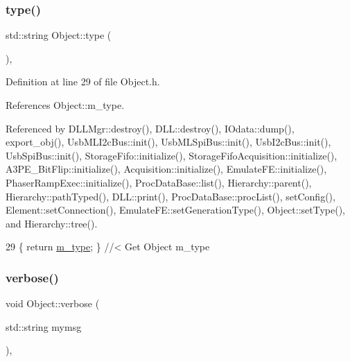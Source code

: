 \subsubsection{\texorpdfstring{type()}{type()}}
{\footnotesize\ttfamily std\+::string Object\+::type (\begin{DoxyParamCaption}{ }\end{DoxyParamCaption})\hspace{0.3cm}{\ttfamily [inline]}, {\ttfamily [inherited]}}



Definition at line 29 of file Object.\+h.



References Object\+::m\+\_\+type.



Referenced by D\+L\+L\+Mgr\+::destroy(), D\+L\+L\+::destroy(), I\+Odata\+::dump(), export\+\_\+obj(), Usb\+M\+L\+I2c\+Bus\+::init(), Usb\+M\+L\+Spi\+Bus\+::init(), Usb\+I2c\+Bus\+::init(), Usb\+Spi\+Bus\+::init(), Storage\+Fifo\+::initialize(), Storage\+Fifo\+Acquisition\+::initialize(), A3\+P\+E\+\_\+\+Bit\+Flip\+::initialize(), Acquisition\+::initialize(), Emulate\+F\+E\+::initialize(), Phaser\+Ramp\+Exec\+::initialize(), Proc\+Data\+Base\+::list(), Hierarchy\+::parent(), Hierarchy\+::path\+Typed(), D\+L\+L\+::print(), Proc\+Data\+Base\+::proc\+List(), set\+Config(), Element\+::set\+Connection(), Emulate\+F\+E\+::set\+Generation\+Type(), Object\+::set\+Type(), and Hierarchy\+::tree().


\begin{DoxyCode}
29 \{ \textcolor{keywordflow}{return} \hyperlink{classObject_a457a600fe8c00eb1034374f75110a78c}{m\_type};       \} \textcolor{comment}{//< Get Object m\_type}
\end{DoxyCode}
\mbox{\label{classObject_a83d2db2df682907ea1115ad721c1c4a1}} 
\subsubsection{\texorpdfstring{verbose()}{verbose()}\hspace{0.1cm}{\footnotesize\ttfamily [1/2]}}
{\footnotesize\ttfamily void Object\+::verbose (\begin{DoxyParamCaption}\item[{std\+::string}]{mymsg }\end{DoxyParamCaption})\hspace{0.3cm}{\ttfamily [inline]}, {\ttfamily [inherited]}}



